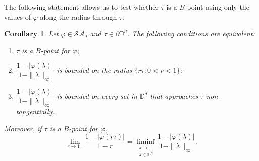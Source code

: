 \documentclass[11pt, reqno]{amsart}
\newtheorem{corollary}[theorem]{Corollary}
\newcommand\1{\boldsymbol {1}}
\numberwithin{equation}{section}
\begin{document}
The following statement allows us to test whether $\tau$ is a $B$-point using only the values of $\varphi$ along the radius through $\tau$. 
\begin{corollary}\label{coro4.14cara}
Let $\varphi\in\mathcal{SA}_{d}$ and $\tau\in\partial\mathbb{D}^{d}$. The following conditions are equivalent:
\begin{enumerate}
    \item $\tau$ is a $B$-point for $\varphi$;
    \item $\dfrac{1-\lvert \varphi(\lambda) \rvert}{1-\|\lambda\|_{\infty}}$ is bounded on the radius $\{r\tau : 0<r<1\}$;
    \item $\dfrac{1-\lvert \varphi(\lambda) \rvert}{1-\|\lambda\|_{\infty}}$ is bounded on every set in $\mathbb{D}^{d}$ that approaches $\tau$ non-tangentially.
\end{enumerate}
Moreover, if $\tau$ is a $B$-point for $\varphi$, 
\begin{equation}\label{equationforcorollary4.14}
\lim_{r\rightarrow 1^{-}} \dfrac{1-\lvert \varphi(r\tau)\rvert}{1-r} = \liminf_{\substack{\lambda\rightarrow \tau \\ \lambda\in\mathbb{D}^{d}}}\dfrac{1-\lvert \varphi(\lambda)\rvert}{1-\|\lambda\|_{\infty}}.
\end{equation}
\end{corollary}
\end{document}
